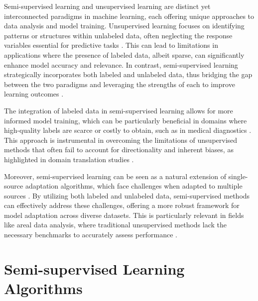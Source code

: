 Semi-supervised learning and unsupervised learning are distinct yet interconnected paradigms in machine learning, each offering unique approaches to data analysis and model training. Unsupervised learning focuses on identifying patterns or structures within unlabeled data, often neglecting the response variables essential for predictive tasks \cite{xie2015onlinesupervisedsubspacetracking}. This can lead to limitations in applications where the presence of labeled data, albeit sparse, can significantly enhance model accuracy and relevance. In contrast, semi-supervised learning strategically incorporates both labeled and unlabeled data, thus bridging the gap between the two paradigms and leveraging the strengths of each to improve learning outcomes \cite{alabi2019learningprunespeedingrepeated}.



The integration of labeled data in semi-supervised learning allows for more informed model training, which can be particularly beneficial in domains where high-quality labels are scarce or costly to obtain, such as in medical diagnostics \cite{zolfaghari2023surveyautomateddetectionclassification}. This approach is instrumental in overcoming the limitations of unsupervised methods that often fail to account for directionality and inherent biases, as highlighted in domain translation studies \cite{bogoychev2020domaintranslationesenoisesynthetic}.



Moreover, semi-supervised learning can be seen as a natural extension of single-source adaptation algorithms, which face challenges when adapted to multiple sources \cite{zhao2017multiplesourcedomainadaptation}. By utilizing both labeled and unlabeled data, semi-supervised methods can effectively address these challenges, offering a more robust framework for model adaptation across diverse datasets. This is particularly relevant in fields like areal data analysis, where traditional unsupervised methods lack the necessary benchmarks to accurately assess performance \cite{vidanapathirana2022clusterdetectioncapabilitiesaverage}.














\section{Semi-supervised Learning Algorithms} \label{sec:Semi-supervised Learning Algorithms}

